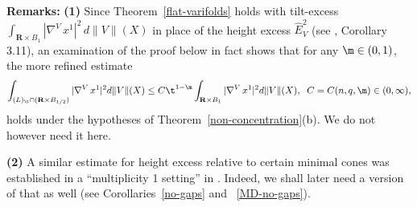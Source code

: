 \documentclass[a4paper,11pt]{amsart}
\begin{document}
\noindent
{\bf Remarks:} {\bf (1)} Since Theorem~\ref{flat-varifolds} holds with tilt-excess $\int_{{\mathbf R} \times B_{1}}|\nabla^{V} \, x^{1}|^{2} \, d\|V\|(X)$ in place of the height excess ${\hat E}_{V}^{2}$ (see \cite{A}, Corollary 3.11), an examination of the proof below in fact shows that for any $\m \in (0, 1)$, the more refined estimate 
$$\int_{(L)_{\t} \cap ({\mathbf R} \times B_{1/2})} |\nabla^{V} \, x^{1}|^{2} d\|V\|(X) \leq C\t^{1-\m}\int_{{\mathbf R} \times B_{1}} |\nabla^{V} \, x^{1}|^{2}d\|V\|(X), \;\; C = C(n, q, \m) \in (0, \infty),$$
holds under the hypotheses of Theorem~\ref{non-concentration}(b). We do not however need it here. 

\noindent
{\bf (2)} A similar estimate for height excess relative to certain minimal cones was established in a ``multiplicity 1 setting'' in \cite{S}. Indeed, we shall later need a version of that as well (see Corollaries~\ref{no-gaps} and ~\ref{MD-no-gaps}).  
\end{document}
